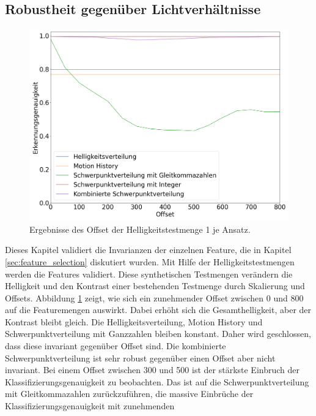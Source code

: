 \subsection{Robustheit gegenüber Lichtverhältnisse}
\label{sec:brightness_eval}
\begin{figure}[h!]
    \centering
    \includegraphics[width=\linewidth]{images/brightness_offset.png}
    \caption{Ergebnisse des Offset der Helligkeitstestmenge 1 je Ansatz.}
    \label{fig:brightness_offset}
\end{figure}
Dieses Kapitel validiert die Invarianzen der einzelnen Feature, die in Kapitel \ref{sec:feature_selection} diskutiert wurden. Mit Hilfe der Helligkeitstestmengen werden die Features validiert. Diese synthetischen Testmengen
verändern die Helligkeit und den Kontrast einer bestehenden Testmenge durch Skalierung und Offsets.
\newline
\newline
Abbildung \ref{fig:brightness_offset} zeigt, wie sich ein zunehmender Offset zwischen 0 und 800 auf die Featuremengen auswirkt. Dabei erhöht sich die Gesamthelligkeit, aber der Kontrast bleibt gleich.
Die Helligkeitsverteilung, Motion History und Schwerpunktverteilung mit Ganzzahlen bleiben
konstant. Daher wird geschlossen, dass diese invariant gegenüber Offset sind. Die kombinierte Schwerpunktverteilung ist sehr robust gegenüber einen Offset aber nicht invariant. Bei einem Offset zwischen 300 und 500 ist
der stärkste Einbruch der Klassifizierungsgenauigkeit zu beobachten. Das ist auf die Schwerpunktverteilung mit Gleitkommazahlen zurückzuführen, die massive Einbrüche der Klassifizierungsgenauigkeit mit zunehmenden
